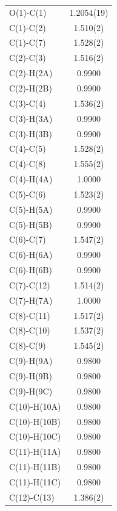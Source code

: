 \begin{center}
\tablefirsthead{%
\toprule}
\tablelasttail{\bottomrule}
{\footnotesize \singlespacing
\begin{supertabular}{p{1.5in}c}
O(1)-C(1) 	&1.2054(19) \\
C(1)-C(2) 	&1.510(2) \\
C(1)-C(7) 	&1.528(2) \\
C(2)-C(3) 	&1.516(2) \\
C(2)-H(2A) &	0.9900 \\
C(2)-H(2B) &	0.9900\\
C(3)-C(4) 	&1.536(2)\\ 
C(3)-H(3A) &	0.9900 \\
C(3)-H(3B) &	0.9900 \\
C(4)-C(5) 	&1.528(2) \\
C(4)-C(8) 	&1.555(2) \\
C(4)-H(4A) &	1.0000 \\
C(5)-C(6) 	&1.523(2) \\
C(5)-H(5A) &	0.9900 \\
C(5)-H(5B) &	0.9900 \\
C(6)-C(7) 	&1.547(2) \\
C(6)-H(6A) &	0.9900 \\
C(6)-H(6B) &	0.9900 \\
C(7)-C(12) &	1.514(2) \\
C(7)-H(7A) &	1.0000\\ 
C(8)-C(11) &	1.517(2)\\ 
C(8)-C(10) &	1.537(2) \\
C(8)-C(9) 	&1.545(2)\\ 
C(9)-H(9A) &	0.9800 \\
C(9)-H(9B) &	0.9800 \\
C(9)-H(9C) &	0.9800 \\
C(10)-H(10A)& 	0.9800 \\
C(10)-H(10B) &	0.9800 \\
C(10)-H(10C) &	0.9800 \\
C(11)-H(11A) &	0.9800 \\
C(11)-H(11B) 	&0.9800 \\
C(11)-H(11C) &	0.9800 \\
C(12)-C(13) &	1.386(2) \\

\end{supertabular}}
\end{center}
